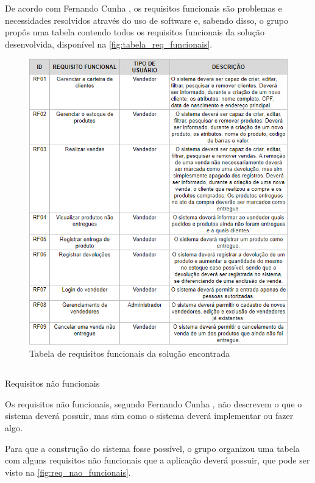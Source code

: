 \documentclass[serif, english, brazilian, oneside]{uffstex}
\begin{document}
De acordo com Fernando Cunha \cite{requisitos-o-que-sao}, os requisitos funcionais são problemas e necessidades resolvidos através do uso de software e, sabendo disso, o grupo propôs uma tabela contendo todos os requisitos funcionais da solução desenvolvida, disponível na \autoref{fig:tabela_req_funcionais}.

\newpage

\begin{figure}[!htpb]
    \centering
    \caption{Tabela de requisitos funcionais da solução encontrada}
    \label{fig:tabela_req_funcionais}
    \includegraphics[width=\linewidth]{imagens/tabela_req_funcionais.png}
\end{figure}

\subsection{}{Requisitos não funcionais}

Os requisitos não funcionais, segundo Fernando Cunha \cite{requisitos-o-que-sao}, não descrevem o que o sistema deverá possuir, mas sim como o sistema deverá implementar ou fazer algo.

Para que a construção do sistema fosse possível, o grupo organizou uma tabela com alguns requisitos não funcionais que a aplicação deverá possuir, que pode ser visto na \autoref{fig:req_nao_funcionais}.
\end{document}
